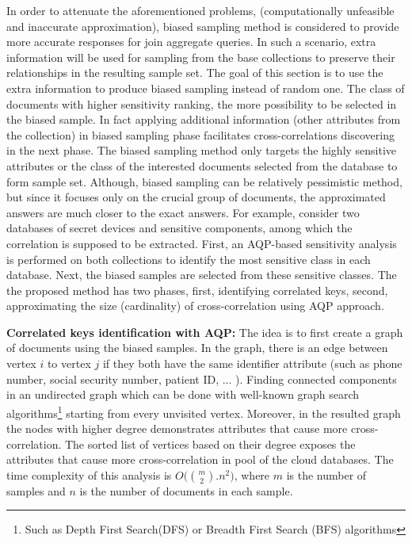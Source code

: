 In order to attenuate the aforementioned problems, (computationally unfeasible  and inaccurate approximation), biased sampling method is considered to  provide more accurate responses for join aggregate queries. In such a scenario, extra information will be used for sampling from the base collections to preserve their relationships in the resulting sample set. The goal of this section is to use the extra information to produce biased sampling instead of random one. The class of documents with higher sensitivity ranking, the more possibility to be selected in the biased sample. In fact applying additional information (other attributes from the collection) in biased sampling phase facilitates cross-correlations discovering in the next phase. The biased sampling method only targets the highly sensitive attributes or the class of the interested documents selected from the database to form sample set. Although, biased sampling can be relatively pessimistic method, but since it focuses only on the crucial group of documents, the approximated answers are much closer to the exact answers. For example, consider two databases of secret devices and sensitive components, among which the correlation is supposed to be extracted. First, an AQP-based sensitivity analysis is performed on both collections to identify the most sensitive class in each database. Next, the biased samples are selected from these sensitive classes. The the proposed method has two phases, first, identifying correlated keys, second, approximating the size (cardinality) of cross-correlation using AQP approach.


\noindent \textbf{Correlated keys identification with AQP:} The idea is to first create a graph of documents using the biased samples. In the graph, there is an edge between vertex $i$ to vertex $j$ if they both have the same identifier attribute (such as phone number, social security number, patient ID, ... ). Finding connected components in an undirected graph which can be done with well-known graph search algorithms\footnote{Such as Depth First Search(DFS) or Breadth First Search (BFS) algorithms} starting from every unvisited vertex. Moreover, in the resulted graph the nodes with higher degree demonstrates attributes that cause more cross-correlation. The sorted list of vertices based on their degree exposes the attributes that cause more cross-correlation in pool of the cloud databases. The time complexity of this analysis is $O\big( \binom{m}{2}.n^2 \big)$, where $m$ is the number of samples and $n$ is the number of documents in each sample.


